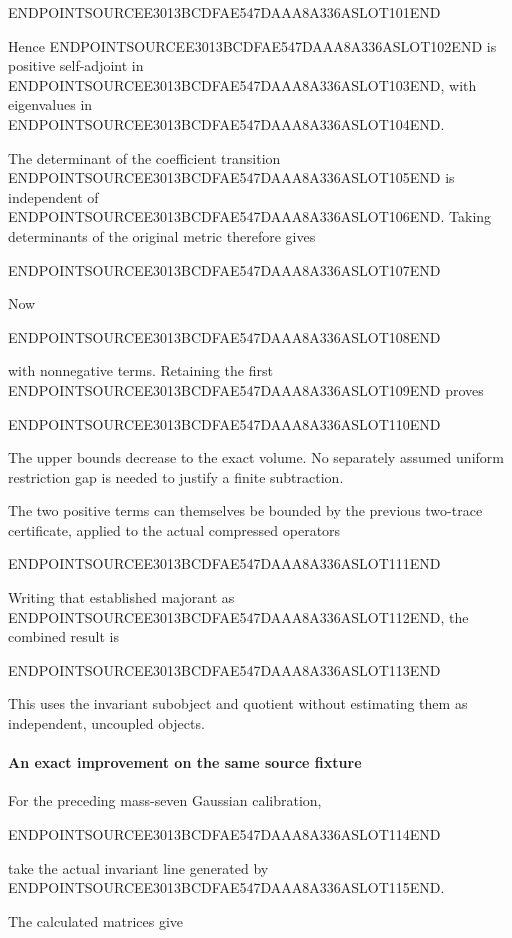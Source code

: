 ENDPOINTSOURCEE3013BCDFAE547DAAA8A336ASLOT101END

Hence ENDPOINTSOURCEE3013BCDFAE547DAAA8A336ASLOT102END is positive self-adjoint in ENDPOINTSOURCEE3013BCDFAE547DAAA8A336ASLOT103END, with eigenvalues in ENDPOINTSOURCEE3013BCDFAE547DAAA8A336ASLOT104END.

The determinant of the coefficient transition ENDPOINTSOURCEE3013BCDFAE547DAAA8A336ASLOT105END is independent of ENDPOINTSOURCEE3013BCDFAE547DAAA8A336ASLOT106END. Taking determinants of the original metric therefore gives

ENDPOINTSOURCEE3013BCDFAE547DAAA8A336ASLOT107END

Now

ENDPOINTSOURCEE3013BCDFAE547DAAA8A336ASLOT108END

with nonnegative terms. Retaining the first ENDPOINTSOURCEE3013BCDFAE547DAAA8A336ASLOT109END proves

ENDPOINTSOURCEE3013BCDFAE547DAAA8A336ASLOT110END

The upper bounds decrease to the exact volume. No separately assumed uniform restriction gap is needed to justify a finite subtraction.

The two positive terms can themselves be bounded by the previous two-trace certificate, applied to the actual compressed operators

ENDPOINTSOURCEE3013BCDFAE547DAAA8A336ASLOT111END

Writing that established majorant as ENDPOINTSOURCEE3013BCDFAE547DAAA8A336ASLOT112END, the combined result is

ENDPOINTSOURCEE3013BCDFAE547DAAA8A336ASLOT113END

This uses the invariant subobject and quotient without estimating them as independent, uncoupled objects.

\paragraph{An exact improvement on the same source fixture}\label{endpoint-exponential_constituent_original--an-exact-improvement-on-the-same-source-fixture}

For the preceding mass-seven Gaussian calibration,

ENDPOINTSOURCEE3013BCDFAE547DAAA8A336ASLOT114END

take the actual invariant line generated by ENDPOINTSOURCEE3013BCDFAE547DAAA8A336ASLOT115END.

The calculated matrices give

